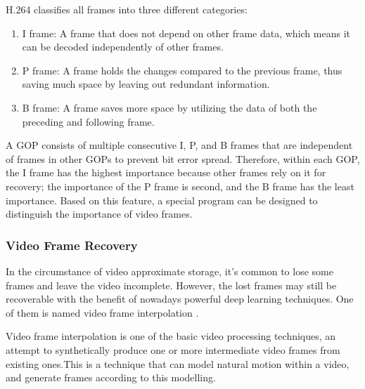 \documentclass[sigconf]{acmart}
\begin{document}
H.264 classifies all frames into three different categories:
\begin{enumerate}
    \item I frame: A frame that does not depend on other frame data, which means it can be decoded independently of other frames.
    \item P frame: A frame holds the changes compared to the previous frame, thus saving much space by leaving out redundant information.
    \item B frame: A frame saves more space by utilizing the data of both the preceding and following frame.
\end{enumerate}
A GOP consists of multiple consecutive I, P, and B frames that are independent of frames in other GOPs to prevent bit error spread.
Therefore, within each GOP, the I frame has the highest importance because other frames rely on it for recovery; the importance of the P frame is second, and the B frame has the least importance. Based on this feature, a special program can be designed to distinguish the importance of video frames.

\subsubsection{Video Frame Recovery}
In the circumstance of video approximate storage, it's common to lose some frames and leave the video incomplete. However, the lost frames may still be recoverable with the benefit of nowadays powerful deep learning techniques. One of them is named video frame interpolation \cite{meyer2015phase, niklaus2018context}.

Video frame interpolation is one of the basic video processing techniques, an attempt to synthetically produce one or more intermediate video frames from existing ones.This is a technique that can model natural motion within a video, and generate frames according to this modelling.
\end{document}
